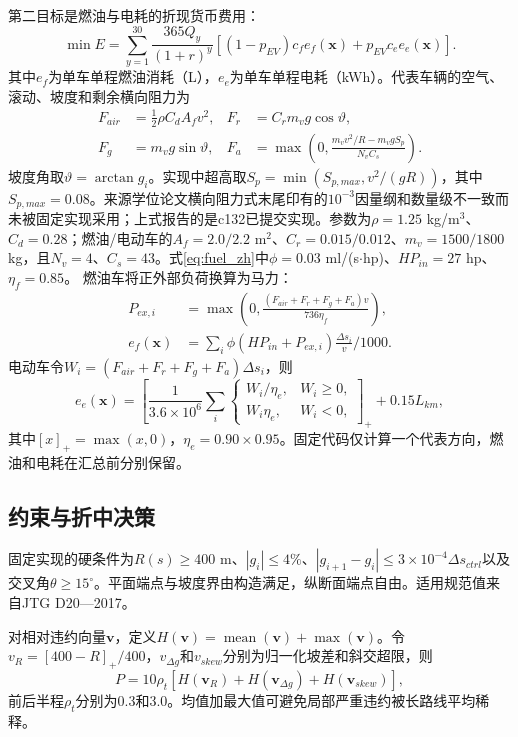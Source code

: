 \documentclass[preprint,12pt]{elsarticle}
\begin{document}
第二目标是燃油与电耗的折现货币费用：
\begin{equation}
\min E=\sum_{y=1}^{30}\frac{365Q_y}{(1+r)^y}
[(1-p_{EV})c_fe_f(\bm x)+p_{EV}c_ee_e(\bm x)].
\label{eq:energy_zh}
\end{equation}
其中$e_f$为单车单程燃油消耗（L），$e_e$为单车单程电耗（kWh）。代表车辆的空气、滚动、坡度和剩余横向阻力为
\begin{align}
F_{air}&=\tfrac12\rho C_dA_fv^2,&F_r&=C_rm_vg\cos\vartheta,\\
F_g&=m_vg\sin\vartheta,&
F_a&=\max\left(0,\frac{m_vv^2/R-m_vgS_p}{N_vC_s}\right).
\end{align}
坡度角取$\vartheta=\arctan g_i$。实现中超高取$S_p=\min(S_{p,max},v^2/(gR))$，其中$S_{p,max}=0.08$。来源学位论文横向阻力式末尾印有的$10^{-3}$因量纲和数量级不一致而未被固定实现采用；上式报告的是c132已提交实现。参数为$\rho=1.25$ kg/m$^3$、$C_d=0.28$；燃油/电动车的$A_f=2.0/2.2$ m$^2$、$C_r=0.015/0.012$、$m_v=1500/1800$ kg，且$N_v=4$、$C_s=43$。式\eqref{eq:fuel_zh}中$\phi=0.03$ ml/(s$\cdot$hp)、$HP_{in}=27$ hp、$\eta_f=0.85$。
燃油车将正外部负荷换算为马力：
\begin{align}
P_{ex,i}&=\max\left(0,\frac{(F_{air}+F_r+F_g+F_a)v}{736\eta_f}\right),\\
e_f(\bm x)&=\sum_i\phi(HP_{in}+P_{ex,i})\frac{\Delta s_i}{v}/1000.
\label{eq:fuel_zh}
\end{align}
电动车令$W_i=(F_{air}+F_r+F_g+F_a)\Delta s_i$，则
\begin{equation}
e_e(\bm x)=\left[\frac{1}{3.6\times10^6}\sum_i
\begin{cases}W_i/\eta_e,&W_i\geq0,\\W_i\eta_e,&W_i<0,
\end{cases}\right]_+ +0.15L_{km},
\label{eq:ev_zh}
\end{equation}
其中$[x]_+=\max(x,0)$，$\eta_e=0.90\times0.95$。固定代码仅计算一个代表方向，燃油和电耗在汇总前分别保留。

\subsection{约束与折中决策}

固定实现的硬条件为$R(s)\geq400$ m、$|g_i|\leq4\%$、$|g_{i+1}-g_i|\leq3\times10^{-4}\Delta s_{ctrl}$以及交叉角$\theta\geq15^\circ$。平面端点与坡度界由构造满足，纵断面端点自由。适用规范值来自JTG D20—2017\cite{jtgd20}。

对相对违约向量$\bm v$，定义$H(\bm v)=\operatorname{mean}(\bm v)+\max(\bm v)$。令$v_R=[400-R]_+/400$，$v_{\Delta g}$和$v_{skew}$分别为归一化坡差和斜交超限，则
\begin{equation}
P=10\rho_t[H(\bm v_R)+H(\bm v_{\Delta g})+H(\bm v_{skew})],
\label{eq:penalty_zh}
\end{equation}
前后半程$\rho_t$分别为0.3和3.0。均值加最大值可避免局部严重违约被长路线平均稀释。
\end{document}
